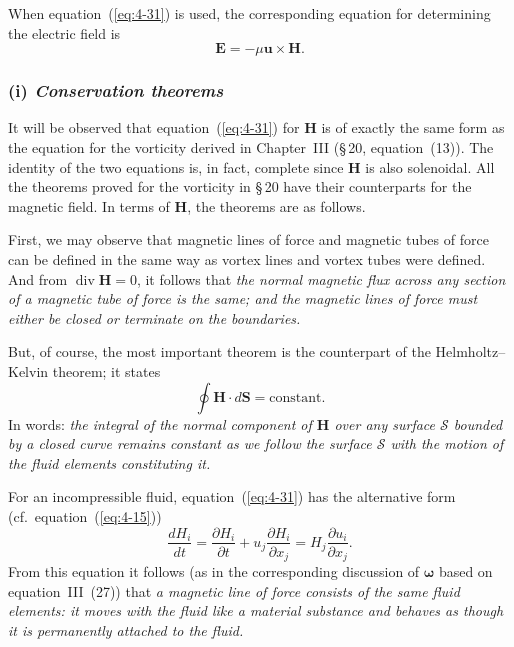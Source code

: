 When equation~(\ref{eq:4-31}) is used, the corresponding equation for determining the electric field is
\begin{equation}
\label{eq:4-32}
\mathbf{E} = -\mu\mathbf{u}\times\mathbf{H}.
\end{equation}

\subsubsection*{(i) \emph{Conservation theorems}}

It will be observed that equation~(\ref{eq:4-31}) for $\mathbf{H}$ is of exactly the same form as the equation for the vorticity derived in Chapter~III (\S\,20, equation~(13)). The identity of the two equations is, in fact, complete since $\mathbf{H}$ is also solenoidal. All the theorems proved for the vorticity in \S\,20 have their counterparts for the magnetic field. In terms of $\mathbf{H}$, the theorems are as follows.

First, we may observe that magnetic lines of force and magnetic tubes of force can be defined in the same way as vortex lines and vortex tubes were defined. And from $\operatorname{div}\mathbf{H}=0$, it follows that \emph{the normal magnetic flux across any section of a magnetic tube of force is the same; and the magnetic lines of force must either be closed or terminate on the boundaries.}

But, of course, the most important theorem is the counterpart of the Helmholtz--Kelvin theorem; it states
\begin{equation}
\label{eq:4-33}
\oint \mathbf{H}\cdot d\mathbf{S} = \text{constant}.
\end{equation}
In words: \emph{the integral of the normal component of $\mathbf{H}$ over any surface $\mathcal{S}$ bounded by a closed curve remains constant as we follow the surface $\mathcal{S}$ with the motion of the fluid elements constituting it.}

For an incompressible fluid, equation~(\ref{eq:4-31}) has the alternative form (cf.\ equation~(\ref{eq:4-15}))
\begin{equation}
\label{eq:4-34}
\frac{dH_i}{dt} = \frac{\partial H_i}{\partial t}+u_j\frac{\partial H_i}{\partial x_j} = H_j\frac{\partial u_i}{\partial x_j}.
\end{equation}
From this equation it follows (as in the corresponding discussion of $\boldsymbol{\omega}$ based on equation~III~(27)) that \emph{a magnetic line of force consists of the same fluid elements: it moves with the fluid like a material substance and behaves as though it is permanently attached to the fluid.}


